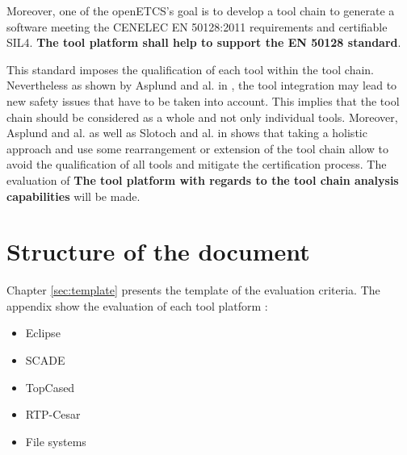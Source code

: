 Moreover, one of the openETCS's goal is to develop a tool chain to
generate a software meeting the CENELEC EN 50128:2011 requirements and
certifiable \gls{SIL}4. {\bf The tool platform shall help to support the EN 50128
standard}. 

This standard imposes the qualification of each tool within
the tool chain.
Nevertheless  as shown by  Asplund and al. in
\cite{asplund_qualifying_2012}, the tool integration may lead to new
safety issues that have to be taken into account. This implies that
the tool chain should be considered as a whole and not only individual
tools.
Moreover, Asplund and al. as well as Slotoch and al. in
\cite{slotosch_iso_2012} shows that taking a holistic approach and use
some rearrangement or extension of the tool chain allow to avoid the
qualification of all tools and mitigate the certification process.
The evaluation of {\bf The tool platform with regards to the tool chain analysis
  capabilities} will be made. 

\printglossary

\section{Structure of the document}

Chapter \ref{sec:template} presents the template of the evaluation
criteria.
The appendix show the evaluation of each tool platform :
\begin{itemize}
\item Eclipse
\item SCADE
\item TopCased
\item RTP-Cesar
\item File systems
\end{itemize}



